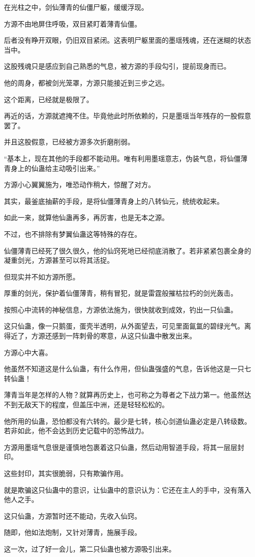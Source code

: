 \begin{this_body}
在光柱之中，剑仙薄青的仙僵尸躯，缓缓浮现。

方源不由地屏住呼吸，双目紧盯着薄青仙僵。

后者没有睁开双眼，仍旧双目紧闭。这表明尸躯里面的墨瑶残魂，还在迷糊的状态当中。

这股残魂只是感应到自己熟悉的气息，被方源的手段勾引，提前现身而已。

他的周身，都被剑光笼罩，方源只能接近到三步之远。

这个距离，已经就是极限了。

再近的话，方源就遮掩不住。毕竟他此时所依赖的，只是墨瑶当年残存的一股假意罢了。

并且这股假意，已经被方源多次折磨削弱。

“基本上，现在其他的手段都不能动用。唯有利用墨瑶意志，伪装气息，将仙僵薄青身上的仙蛊给主动吸引出来。”

方源小心翼翼施为，唯恐动作稍大，惊醒了对方。

其实，最釜底抽薪的手段，是将仙僵薄青身上的八转仙元，统统收起来。

如此一来，就算他仙蛊再多，再厉害，也是无本之源。

不过，也不排除有梦翼仙蛊这等特殊的存在。

仙僵薄青已经死了很久很久，他的仙窍死地已经彻底消散了。若非紧紧包裹全身的凝重剑光，方源甚至可以将其活捉。

但现实并不如方源所愿。

厚重的剑光，保护着仙僵薄青，稍有冒犯，就是雷霆般摧枯拉朽的剑光轰击。

按照心中流转的神秘信息，方源依法施为，很快就收到成效，钓出一只仙蛊。

这只仙蛊，像一只鹅蛋，蛋壳半透明，从外面望去，可见里面氤氲的碧绿光气。离得近了，方源还感到一阵刺骨的寒意，从这只仙蛊中散发出来。

方源心中大喜。

他虽然不知道这是什么仙蛊，有什么作用，但仙蛊强盛的气息，告诉他这是一只七转仙蛊！

薄青当年是怎样的人物？就算再历史上，也可称之为尊者之下战力第一。他虽然达不到无敌天下的程度，但盖压中洲，还是轻轻松松的。

他所用的仙蛊，恐怕都没有六转的。最少是七转，核心剑道仙蛊必定是八转级数。若非如此，他不会达到历史记载中的恐怖战力。

方源用墨瑶气息很是谨慎地包裹着这只仙蛊，然后动用智道手段，将其一层层封印。

这些封印，其实很脆弱，只有欺骗作用。

就是欺骗这只仙蛊中的意识，让仙蛊中的意识认为：它还在主人的手中，没有落入他人之手。

这只仙蛊，方源暂时还不能动，先收入仙窍。

随即，他如法炮制，又针对薄青，施展手段。

这一次，过了好一会儿，第二只仙蛊也被方源吸引出来。

\end{this_body}

